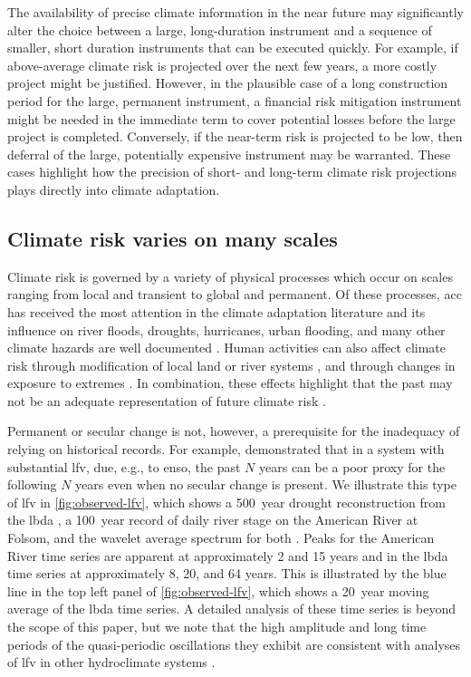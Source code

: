 \documentclass[
  draft,
  linenumbers
]{agujournal2018}
\makeatletter
\newcommand{\eg}{e.g.\@\xspace}
\makeatother
\begin{document}
The availability of precise climate information in the near future may significantly alter the choice between a large, long-duration instrument and a sequence of smaller, short duration instruments that can be executed quickly.
For example, if above-average climate risk is projected over the next few years, a more costly project might be justified.
However, in the plausible case of a long construction period for the large, permanent instrument, a financial risk mitigation instrument might be needed in the immediate term to cover potential losses before the large project is completed.
Conversely, if the near-term risk is projected to be low, then deferral of the large, potentially expensive instrument may be warranted.
These cases highlight how the precision of short- and long-term climate risk projections plays directly into climate adaptation.

\subsection{Climate risk varies on many scales}\label{sec:intro-lfv}

Climate risk is governed by a variety of physical processes which occur on scales ranging from local and transient to global and permanent.
Of these processes, \gls{acc} has received the most attention in the climate adaptation literature and its influence on river floods, droughts, hurricanes, urban flooding, and many other climate hazards are well documented \citep[\eg,][]{Coumou:2012bc,Milly:2008dg,OGorman:2009hj,Trenberth:2003bj}.
Human activities can also affect climate risk through modification of local land or river systems \citep[see][]{Merz:2014gf}, and through changes in exposure to extremes \citep{baldassarre:2018,Jongman:2012cr}.
In combination, these effects highlight that the past may not be an adequate representation of future climate risk \citep[termed ``nonstationarity'' by][]{Milly:2008dg}.

Permanent or secular change is not, however, a prerequisite for the inadequacy of relying on historical records.
For example, \citet{Jain:2001hz} demonstrated that in a system with substantial \acrfull{lfv}, due, \eg, to \gls{enso}, the past $N$ years can be a poor proxy for the following $N$ years even when no secular change is present.
We illustrate this type of \gls{lfv} in \cref{fig:observed-lfv}, which shows a \SI{500}{year} drought reconstruction from the \gls{lbda} \citep{Cook:2010bz}, a \SI{100}{year} record of daily river stage on the American River at Folsom, and the wavelet average spectrum for both \citep{Torrence:1998jp,Roesch:wlBQQoIs}.
Peaks for the American River time series are apparent at approximately 2 and 15 years and in the \gls{lbda} time series at approximately 8, 20, and 64 years.
This is illustrated by the blue line in the top left panel of \cref{fig:observed-lfv}, which shows a \SI{20}{year} moving average of the \gls{lbda} time series.
A detailed analysis of these time series is beyond the scope of this paper, but we note that the high amplitude and long time periods of the quasi-periodic oscillations they exhibit are consistent with analyses of \gls{lfv} in other hydroclimate systems \citep{Kiem:2002kq,Swierczynski:2012km,Woollings:2014kd,Hodgkins:2017hw}.
\end{document}
